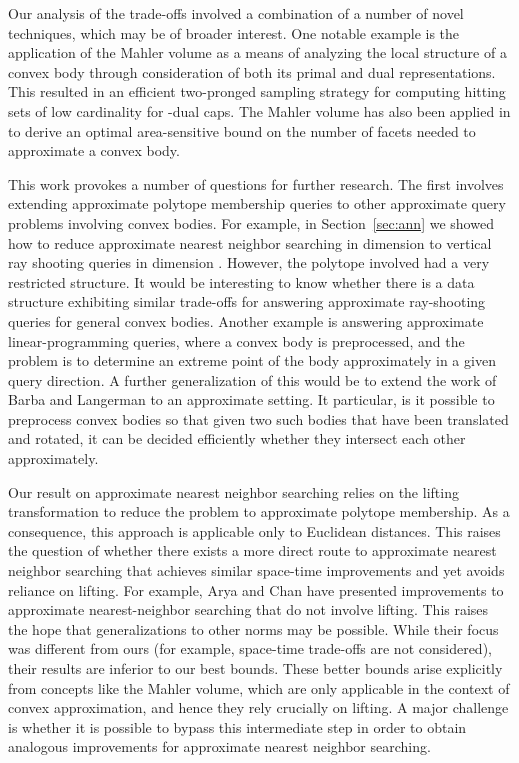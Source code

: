 \documentclass[11pt]{article}   \usepackage[letterpaper,hmargin=2.1cm,vmargin=3cm]{geometry}
\begin{document}
Our analysis of the trade-offs involved a combination of a number of novel techniques, which may be of broader interest. One notable example is the application of the Mahler volume as a means of analyzing the local structure of a convex body through consideration of both its primal and dual representations. This resulted in an efficient two-pronged sampling strategy for computing hitting sets of low cardinality for -dual caps. The Mahler volume has also been applied in \cite{AFM12} to derive an optimal area-sensitive bound on the number of facets needed to approximate a convex body.

This work provokes a number of questions for further research. The first involves extending approximate polytope membership queries to other approximate query problems involving convex bodies. For example, in Section~\ref{sec:ann} we showed how to reduce approximate nearest neighbor searching in dimension  to vertical ray shooting queries in dimension . However, the polytope involved had a very restricted structure. It would be interesting to know whether there is a data structure exhibiting similar trade-offs for answering approximate ray-shooting queries for general convex bodies. Another example is answering approximate linear-programming queries, where a convex body is preprocessed, and the problem is to determine an  extreme point of the body approximately in a given query direction. A further generalization of this would be to extend the work of Barba and Langerman \cite{BaL15} to an approximate setting. It particular, is it possible to preprocess convex bodies so that given two such bodies that have been translated and rotated, it can be decided efficiently whether they intersect each other approximately.

Our result on approximate nearest neighbor searching relies on the lifting transformation to reduce the problem to approximate polytope membership. As a consequence, this approach is applicable only to Euclidean distances. This raises the question of whether there exists a more direct route to approximate nearest neighbor searching that achieves similar space-time improvements and yet avoids reliance on lifting. For example, Arya and Chan \cite{ArC14} have presented improvements to approximate nearest-neighbor searching that do not involve lifting. This raises the hope that generalizations to other norms may be possible. While their focus was different from ours (for example, space-time trade-offs are not considered), their results are inferior to our best bounds. These better bounds arise explicitly from concepts like the Mahler volume, which are only applicable in the context of convex approximation, and hence they rely crucially on lifting. A major challenge is whether it is possible to bypass this intermediate step in order to obtain analogous improvements for approximate nearest neighbor searching.
\end{document}
